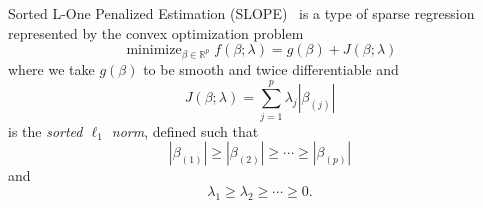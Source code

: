 Sorted L-One Penalized Estimation (SLOPE)~\cite{bogdan2013,bogdan2015} is a
type of sparse regression represented by the convex optimization problem
\begin{equation}
  \label{eq:slope-problem}
  \operatorname{minimize}_{\beta \in \mathbb{R}^p}
  f(\beta; \lambda) = g(\beta) + J(\beta;\lambda)
\end{equation}
where we take \(g(\beta)\) to be smooth and twice differentiable and
\begin{equation}
  \label{eq:sortedl-l1-norm}
  J(\beta; \lambda) = \sum_{j=1}^p \lambda_j|\beta_{(j)}|
\end{equation}
is the \emph{sorted \(\ell_1\) norm}, defined such that
\[
  |\beta_{(1)}| \geq |\beta_{(2)}| \geq \cdots \geq |\beta_{(p)}|
\]
and
\[
  \lambda_1 \geq \lambda_2 \geq \cdots \geq 0.
\]
